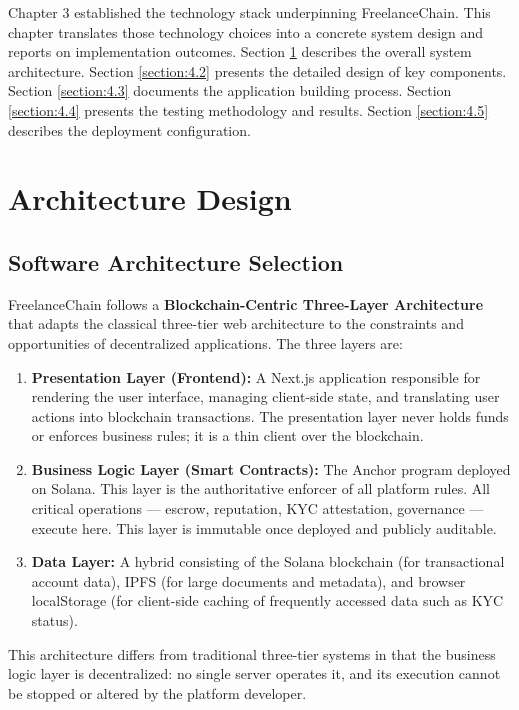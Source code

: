 Chapter 3 established the technology stack underpinning FreelanceChain. This chapter translates those technology choices into a concrete system design and reports on implementation outcomes. Section \ref{section:4.1} describes the overall system architecture. Section \ref{section:4.2} presents the detailed design of key components. Section \ref{section:4.3} documents the application building process. Section \ref{section:4.4} presents the testing methodology and results. Section \ref{section:4.5} describes the deployment configuration.

\section{Architecture Design}
\label{section:4.1}

\subsection{Software Architecture Selection}
\label{subsection:4.1.1}

FreelanceChain follows a \textbf{Blockchain-Centric Three-Layer Architecture} that adapts the classical three-tier web architecture to the constraints and opportunities of decentralized applications. The three layers are:

\begin{enumerate}
    \item \textbf{Presentation Layer (Frontend):} A Next.js application responsible for rendering the user interface, managing client-side state, and translating user actions into blockchain transactions. The presentation layer never holds funds or enforces business rules; it is a thin client over the blockchain.
    \item \textbf{Business Logic Layer (Smart Contracts):} The Anchor program deployed on Solana. This layer is the authoritative enforcer of all platform rules. All critical operations --- escrow, reputation, KYC attestation, governance --- execute here. This layer is immutable once deployed and publicly auditable.
    \item \textbf{Data Layer:} A hybrid consisting of the Solana blockchain (for transactional account data), IPFS (for large documents and metadata), and browser localStorage (for client-side caching of frequently accessed data such as KYC status).
\end{enumerate}

This architecture differs from traditional three-tier systems in that the business logic layer is decentralized: no single server operates it, and its execution cannot be stopped or altered by the platform developer.

